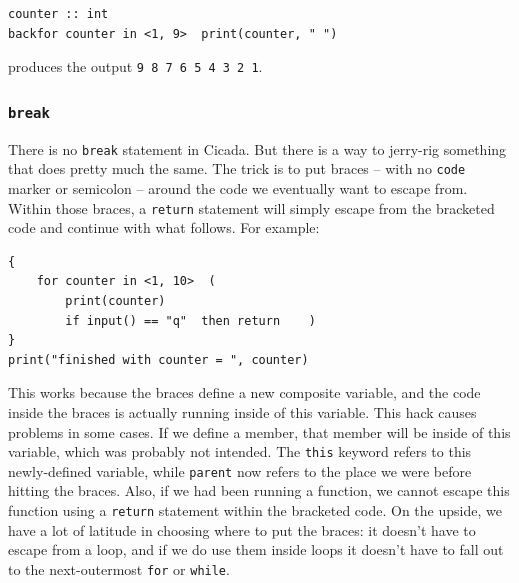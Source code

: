 \documentclass{article}
\newenvironment{code}{
       \begin{list}{}{
               \setlength{\leftmargin}{.4in}
               \setlength{\rightmargin}{0in}
               \setlength{\topsep}{.2in}
       }
       \small
       \item[] }
       { \end{list}   }
\begin{document}
\begin{code} \begin{verbatim}
counter :: int
backfor counter in <1, 9>  print(counter, " ")
\end{verbatim} \end{code}

\noindent produces the output \verb$9 8 7 6 5 4 3 2 1$.





\subsubsection{\texttt{break}} 

There is no \verb#break# statement in Cicada.  But there is a way to jerry-rig something that does pretty much the same.  The trick is to put braces -- with no \verb#code# marker or semicolon -- around the code we eventually want to escape from.  Within those braces, a \verb#return# statement will simply escape from the bracketed code and continue with what follows.  For example:

\begin{code} \begin{verbatim}
{
    for counter in <1, 10>  (
        print(counter)
        if input() == "q"  then return    )
}
print("finished with counter = ", counter)
\end{verbatim} \end{code}

\noindent This works because the braces define a new composite variable, and the code inside the braces is actually running inside of this variable.  This hack causes problems in some cases.  If we define a member, that member will be inside of this variable, which was probably not intended.  The \verb#this# keyword refers to this newly-defined variable, while \verb#parent# now refers to the place we were before hitting the braces.  Also, if we had been running a function, we cannot escape this function using a \verb#return# statement within the bracketed code.  On the upside, we have a lot of latitude in choosing where to put the braces:  it doesn't have to escape from a loop, and if we do use them inside loops it doesn't have to fall out to the next-outermost \verb#for# or \verb#while#.

\end{document}
